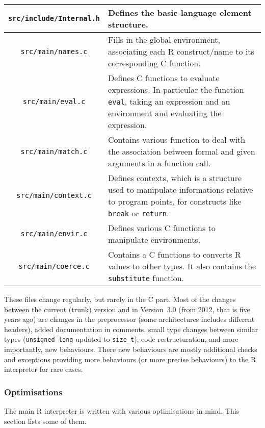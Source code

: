 \documentclass{article}
\newcommand\R{R}
\newcommand\Cn{C}
\begin{document}
\begin{tabular}{|c|p{7cm}|}
    \hline
    \texttt{src/include/Internal.h} & Defines the basic language element structure. \\
    \hline
    \texttt{src/main/names.c} & Fills in the global environment, associating each \R{} construct/name to its corresponding \Cn{} function. \\
    \hline
    \texttt{src/main/eval.c} & Defines \Cn{} functions to evaluate expressions. In particular the function \texttt{eval}, taking an expression and an environment and evaluating the expression. \\
    \hline
    \texttt{src/main/match.c} & Contains various function to deal with the association between formal and given arguments in a function call. \\
    \hline
    \texttt{src/main/context.c} & Defines contexts, which is a structure used to manipulate informations relative to program points, for constructs like \texttt{break} or \texttt{return}. \\
    \hline
    \texttt{src/main/envir.c} & Defines various \Cn{} functions to manipulate environments. \\
    \hline
    \texttt{src/main/coerce.c} & Contains a \Cn{} functions to converts \R{} values to other types. It also contains the \texttt{substitute} function. \\
    \hline
\end{tabular}

These files change regularly,
but rarely in the \Cn{} part.
Most of the changes between the current (trunk) version
and in Version~\(3.0\) (from 2012, that is five years ago)
are changes in the preprocessor
(some architectures includes different headers),
added documentation in comments,
small type changes between similar types
(\texttt{unsigned long} updated to \texttt{size_t}),
code restructuration,
and more importantly,
new behaviours.
There new behaviours are mostly additional checks
and exceptions providing more behaviours
(or more precise behaviours) to the \R{} interpreter
for rare cases.

\subsubsection{Optimisations}
\label{sec:optimisations}

The main \R{} interpreter is written with various optimisations in mind.
This section lists some of them.
\end{document}
